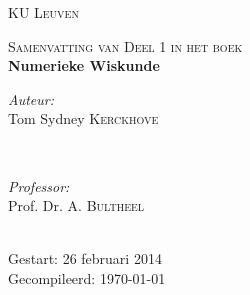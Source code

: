 \begin{titlepage}
\thispagestyle{empty}
\newcommand{\HRule}{\rule{\linewidth}{0.5mm}}
\center
\textsc{\LARGE KU Leuven}\\[1.5cm]
\vfill

\textsc{\large Samenvatting van Deel 1 in het boek}\\[0.5cm]

{ \Huge \bfseries Numerieke Wiskunde}\\[0.4cm]

\vfill

\begin{minipage}{0.4\textwidth}
\begin{flushleft} \large
\emph{Auteur:}\\
Tom Sydney \textsc{Kerckhove}
\end{flushleft}
\end{minipage}
~
\begin{minipage}{0.4\textwidth}
\begin{flushright} \large
\emph{Professor:} \\
Prof. Dr. A. \textsc{Bultheel}\\
\end{flushright}
\end{minipage}\\[4cm]

{\large 
 Gestart: 26 februari 2014\\
 Gecompileerd: \today}\\[3cm]
\vfill

\end{titlepage}
